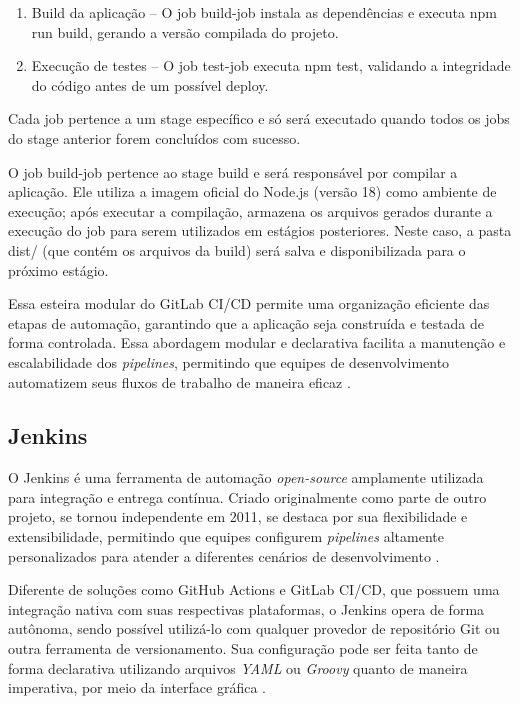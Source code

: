 \begin{enumerate}
    \item Build da aplicação – O job build-job instala as dependências e executa npm run build, gerando a versão compilada do projeto.
    \item Execução de testes – O job test-job executa npm test, validando a integridade do código antes de um possível deploy.
\end{enumerate}

Cada job pertence a um stage específico e só será executado quando todos os jobs do stage anterior forem concluídos com sucesso.

O job build-job pertence ao stage build e será responsável por compilar a aplicação. Ele utiliza a imagem oficial do Node.js (versão 18) como ambiente de execução; após executar a compilação, armazena os arquivos gerados durante a execução do job para serem utilizados em estágios posteriores. Neste caso, a pasta dist/ (que contém os arquivos da build) será salva e disponibilizada para o próximo estágio.

Essa esteira modular do GitLab CI/CD permite uma organização eficiente das etapas de automação, garantindo que a aplicação seja construída e testada de forma controlada. Essa abordagem modular e declarativa facilita a manutenção e escalabilidade dos \textit{pipelines}, permitindo que equipes de desenvolvimento automatizem seus fluxos de trabalho de maneira eficaz \cite{Fowler2024}.

\subsection{Jenkins}  \label{section:Jenkins}

O Jenkins é uma ferramenta de automação \textit{open-source} amplamente utilizada para integração e entrega contínua. Criado originalmente como parte de outro projeto, se tornou independente em 2011, se destaca por sua flexibilidade e extensibilidade, permitindo que equipes configurem \textit{pipelines} altamente personalizados para atender a diferentes cenários de desenvolvimento \cite{JenkinsDocumentation}.

Diferente de soluções como GitHub Actions e GitLab CI/CD, que possuem uma integração nativa com suas respectivas plataformas, o Jenkins opera de forma autônoma, sendo possível utilizá-lo com qualquer provedor de repositório Git ou outra ferramenta de versionamento. Sua configuração pode ser feita tanto de forma declarativa utilizando arquivos \textit{YAML} ou \textit{Groovy} quanto de maneira imperativa, por meio da interface gráfica \cite{JenkinsPipelines}.

